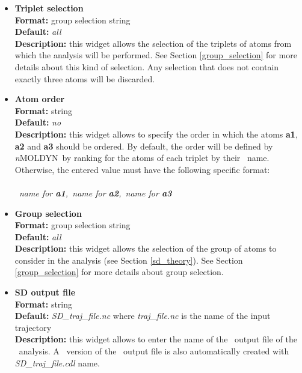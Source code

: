 \documentclass[a4paper,11pt]{report}
\newcommand{\NMOLDYN}{\textit{n}MOLDYN}
\begin{document}
\begin{itemize}
\hypertarget{sd_triplet_selection}{}
\item \textbf{Triplet selection}\\
\textbf{Format:} group selection string\\
\textbf{Default:} \textit{all}\\
\textbf{Description:} this widget allows the selection of the triplets of atoms from which the analysis will be 
performed. See Section \ref{group_selection} for more details about this kind of selection. Any selection that does not 
contain exactly three atoms will be discarded.

\hypertarget{sd_atom_order}{}
\item \textbf{Atom order}\\
\textbf{Format:} string\\
\textbf{Default:} \textit{no}\\
\textbf{Description:} this widget allows to specify the order in which the atoms \textbf{a1}, \textbf{a2} and \textbf{a3} should be 
ordered. By default, the order will be defined by \NMOLDYN\ by ranking for the atoms of each triplet by their
\MMTK\ name. Otherwise, the entered value must have the following specific format:
\\\\
\textit{\MMTK\ name for \textbf{a1},\MMTK\ name for \textbf{a2},\MMTK\ name for \textbf{a3}}

\hypertarget{sd_group_selection}{}
\item \textbf{Group selection}\\
\textbf{Format:} group selection string\\
\textbf{Default:} \textit{all}\\
\textbf{Description:} this widget allows the selection of the group of atoms to consider in the analysis 
(see Section \ref{sd_theory}). See Section \ref{group_selection} for more details about group selection.

\hypertarget{sd_sd_output_file}{}
\item \textbf{SD output file}\\
\textbf{Format:} string\\
\textbf{Default:} \textit{SD\_traj\_file.nc} where \textit{traj\_file.nc} is the name of the input trajectory\\
\textbf{Description:} this widget allows to enter the name of the \NetCDF\ output file of the \SD\ analysis. A \CDL\ 
version of the \NetCDF\ output file is also automatically created with \textit{SD\_traj\_file.cdl} name.
\end{itemize}
\end{document}
